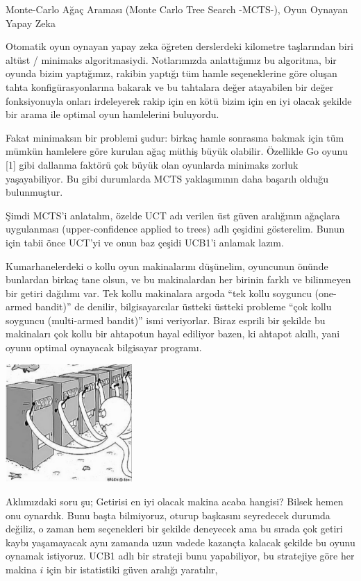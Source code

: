 \documentclass[12pt,fleqn]{article}\usepackage{../../common}
\begin{document}
Monte-Carlo Ağaç Araması (Monte Carlo Tree Search -MCTS-), Oyun Oynayan Yapay Zeka

Otomatik oyun oynayan yapay zeka öğreten derslerdeki kilometre taşlarından
biri altüst / minimaks algoritmasiydi. Notlarımızda anlattığımız bu
algoritma, bir oyunda bizim yaptığımız, rakibin yaptığı tüm hamle
seçeneklerine göre oluşan tahta konfigürasyonlarına bakarak ve bu tahtalara
değer atayabilen bir değer fonksiyonuyla onları irdeleyerek rakip için en
kötü bizim için en iyi olacak şekilde bir arama ile optimal oyun
hamlelerini buluyordu. 

Fakat minimaksın bir problemi şudur: birkaç hamle sonrasına bakmak için tüm
mümkün hamlelere göre kurulan ağaç müthiş büyük olabilir. Özellikle Go
oyunu [1] gibi dallanma faktörü çok büyük olan oyunlarda minimaks zorluk
yaşayabiliyor. Bu gibi durumlarda MCTS yaklaşımının daha başarılı olduğu
bulunmuştur. 

Şimdi MCTS'i anlatalım, özelde UCT adı verilen üst güven aralığının
ağaçlara uygulanması (upper-confidence applied to trees) adlı çeşidini
gösterelim. Bunun için tabii önce UCT'yi ve onun baz çeşidi UCB1'i anlamak
lazım.

Kumarhanelerdeki o kollu oyun makinalarını düşünelim, oyuncunun önünde
bunlardan birkaç tane olsun, ve bu makinalardan her birinin farklı ve
bilinmeyen bir getiri dağılımı var. Tek kollu makinalara argoda ``tek kollu
soyguncu (one-armed bandit)'' de denilir, bilgisayarcılar üstteki üstteki
probleme ``çok kollu soyguncu (multi-armed bandit)'' ismi veriyorlar. Biraz
esprili bir şekilde bu makinaları çok kollu bir ahtapotun hayal ediliyor
bazen, ki ahtapot akıllı, yani oyunu optimal oynayacak bilgisayar programı.

\includegraphics[width=13em]{mcts_01.png}

Aklımızdaki soru şu; Getirisi en iyi olacak makina acaba hangisi? Bilsek
hemen onu oynardık. Bunu başta bilmiyoruz, oturup başkasını seyredecek
durumda değiliz, o zaman hem seçenekleri bir şekilde deneyecek ama bu
sırada çok getiri kaybı yaşamayacak aynı zamanda uzun vadede kazançta
kalacak şekilde bu oyunu oynamak istiyoruz. UCB1 adlı bir strateji bunu
yapabiliyor, bu stratejiye göre her makina $i$ için bir istatistiki güven
aralığı yaratılır, 
\end{document}
